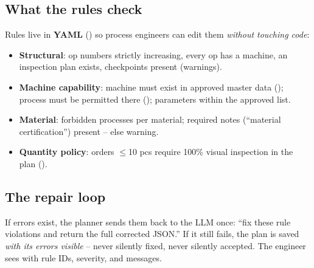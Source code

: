 
\subsection{What the rules check}
Rules live in \textbf{YAML} () so process
engineers can edit them \emph{without touching code}:
\begin{itemize}[nosep]
  \item \textbf{Structural}: op numbers strictly increasing, every op has a machine,
        an inspection plan exists, checkpoints present (warnings).
  \item \textbf{Machine capability}: machine must exist in approved master data
        (); process must be permitted there
        (); parameters within the approved list.
  \item \textbf{Material}: forbidden processes per material; required notes
        (``material certification'') present -- else warning.
  \item \textbf{Quantity policy}: orders $\leq$10 pcs require 100\% visual inspection
        in the plan ().
\end{itemize}

\subsection{The repair loop}
If errors exist, the planner sends them back to the LLM once: ``fix these rule
violations and return the full corrected JSON.'' If it still fails, the plan is saved
\emph{with its errors visible} -- never silently fixed, never silently accepted. The
engineer sees  with rule IDs, severity, and messages.

\begin{center}
\end{center}

